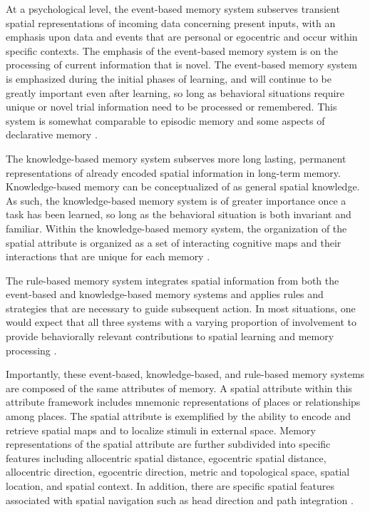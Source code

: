 \documentclass[doc, longtable]{apa6}
\begin{document}
At a psychological level, the event-based memory system subserves transient spatial representations of incoming data concerning present inputs, with an emphasis upon data and events that are personal or egocentric and occur within specific contexts. The emphasis of the event-based memory system is on the processing of current information that is novel. The event-based memory system is emphasized during the initial phases of learning, and will continue to be greatly important even after learning, so long as behavioral situations require unique or novel trial information need to be processed or remembered. This system is somewhat comparable to episodic memory and some aspects of declarative memory \parencite{Squire2004b,Squire1992b, Tulving}.

The knowledge-based memory system subserves more long lasting, permanent representations of already encoded spatial information in long-term memory. Knowledge-based memory can be conceptualized of as general spatial knowledge. As such, the knowledge-based memory system is of greater importance once a task has been learned, so long as the behavioral situation is both invariant and familiar. Within the knowledge-based memory system, the organization of the spatial attribute is organized as a set of interacting cognitive maps and their interactions that are unique for each memory \parencite{Hunsaker2013c,Kesner2013e}.

The rule-based memory system integrates spatial information from both the event-based and knowledge-based memory systems and applies rules and strategies that are necessary to guide subsequent action. In most situations, one would expect that all three systems with a varying proportion of involvement to provide behaviorally relevant contributions to spatial learning and memory processing \parencite{Kesner2013e,Kesner1998c}. 

Importantly, these event-based, knowledge-based, and rule-based memory systems are composed of the same attributes of memory. A spatial attribute within this attribute framework includes mnemonic representations of places or relationships among places. The spatial attribute is exemplified by the ability to encode and retrieve spatial maps and to localize stimuli in external space. Memory representations of the spatial attribute are further subdivided into specific features including allocentric spatial distance, egocentric spatial distance, allocentric direction, egocentric direction, metric and topological space, spatial location, and spatial context. In addition, there are specific spatial features associated with spatial navigation such as head direction and path integration \parencite{Hunsaker2013c,Kesner1998c}. 
\end{document}
